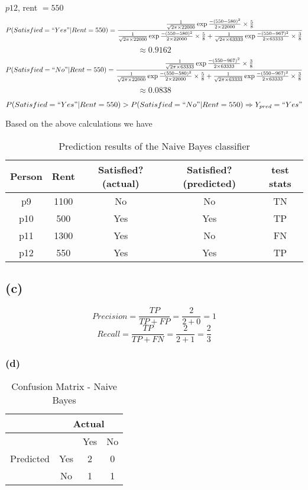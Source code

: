 \documentclass{article}
\begin{document}
\par $p12$, rent $= 550$
\[
P(Satisfied=``Yes"|Rent=550) = \frac{\frac{1}{\sqrt{2\pi\times22000}}\exp{\frac{-(550-580)^2}{2\times22000}}\times \frac{5}{8}}{\frac{1}{\sqrt{2\pi\times22000}}\exp{\frac{-(550-580)^2}{2\times22000}}\times\frac{5}{8} + \frac{1}{\sqrt{2\pi\times63333}}\exp{\frac{-(550-967)^2}{2\times63333}}\times\frac{3}{8}}
\]\[\approx 0.9162 \]
\[P(Satisfied=``No"|Rent=550) 
= \frac{\frac{1}{\sqrt{2\pi\times63333}}\exp{\frac{-(550-967)^2}{2\times63333}}\times\frac{3}{8}}{ \frac{1}{\sqrt{2\pi\times22000}}\exp{\frac{-(550-580)^2}{2\times22000}}\times\frac{5}{8} + \frac{1}{\sqrt{2\pi\times63333}}\exp{\frac{-(550-967)^2}{2\times63333}}\times\frac{3}{8}}
\]\[\approx 0.0838\]

$P(Satisfied=``Yes"|Rent=550) > P(Satisfied=``No"|Rent=550) \Rightarrow Y_{pred}=``Yes"$

\par Based on the above calculations we have

\begin{table}[h]
\centering
\begin{tabular}{|c|c|c|c|c|}
\hline
Person & Rent & Satisfied? (actual) & Satisfied? (predicted) & test stats \\ \hline
p9     & 1100 & No                  & No                     & TN         \\ \hline
p10    & 500  & Yes                 & Yes                    & TP         \\ \hline
p11    & 1300 & Yes                 & No                     & FN         \\ \hline
p12    & 550  & Yes                 & Yes                    & TP         \\ \hline
\end{tabular}
\caption{Prediction results of the Naive Bayes classifier}
\end{table}

\subsection{(c)}
\[Precision = \frac{TP}{TP+FP} = \frac{2}{2+0} = 1\]
\[Recall = \frac{TP}{TP+FN} = \frac{2}{2+1} = \frac{2}{3}\]


\subsubsection{(d)}

\begin{table}[h]
\centering
\begin{tabular}{|c|c|c|c|}
\hline
                           & \multicolumn{3}{c|}{Actual} \\ \hline
\multirow{3}{*}{Predicted} &          & Yes     & No     \\ \cline{2-4} 
                           & Yes      & 2       & 0      \\ \cline{2-4} 
                           & No       & 1       & 1      \\ \hline
\end{tabular}
\caption{Confusion Matrix - Naive Bayes}
\end{table}
\end{document}
